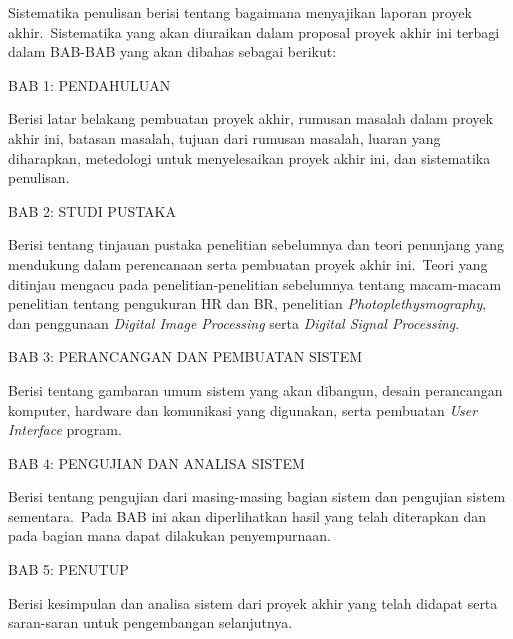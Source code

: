 Sistematika penulisan berisi tentang bagaimana menyajikan laporan proyek akhir.~Sistematika yang akan diuraikan dalam proposal proyek akhir ini terbagi dalam BAB-BAB yang akan dibahas sebagai berikut:

BAB 1: PENDAHULUAN

Berisi latar belakang pembuatan proyek akhir, rumusan masalah dalam proyek akhir ini, batasan masalah, tujuan dari rumusan masalah, luaran yang diharapkan, metedologi untuk menyelesaikan proyek akhir ini, dan sistematika penulisan.

BAB 2: STUDI PUSTAKA

Berisi tentang tinjauan pustaka penelitian sebelumnya dan teori penunjang yang mendukung dalam perencanaan serta pembuatan proyek akhir ini.~Teori yang ditinjau mengacu pada penelitian-penelitian sebelumnya tentang macam-macam penelitian tentang pengukuran HR dan BR, penelitian \textit{Photoplethysmography}, dan penggunaan \textit{Digital Image Processing} serta \textit{Digital Signal Processing}.

BAB 3: PERANCANGAN DAN PEMBUATAN SISTEM

Berisi tentang gambaran umum sistem yang akan dibangun, desain perancangan komputer, hardware dan komunikasi yang digunakan, serta pembuatan \textit{User Interface} program.

BAB 4: PENGUJIAN DAN ANALISA SISTEM

Berisi tentang pengujian dari masing-masing bagian sistem dan pengujian sistem sementara.~Pada BAB ini akan diperlihatkan hasil yang telah diterapkan dan pada bagian mana dapat dilakukan penyempurnaan.

BAB 5: PENUTUP

Berisi kesimpulan dan analisa sistem dari proyek akhir yang telah didapat serta saran-saran untuk pengembangan selanjutnya.